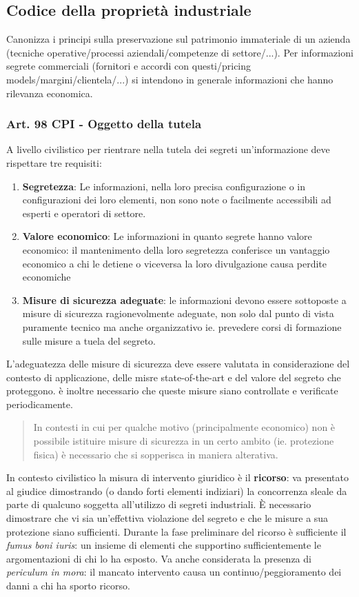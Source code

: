 \documentclass[11pt,a4paper]{article}
\begin{document}
\subsection{Codice della proprietà industriale}
Canonizza i principi sulla preservazione sul patrimonio immateriale di un azienda (tecniche operative/processi aziendali/competenze di settore/...).
Per informazioni segrete commerciali (fornitori e accordi con questi/pricing models/margini/clientela/...) si intendono in generale informazioni che hanno rilevanza economica.

\subsubsection{Art. 98 CPI - Oggetto della tutela}
A livello civilistico per rientrare nella tutela dei segreti un'informazione deve rispettare tre requisiti:
\begin{enumerate}
    \item \textbf{Segretezza}: Le informazioni, nella loro precisa configurazione o in configurazioni dei loro elementi, non sono note o facilmente accessibili ad esperti e operatori di settore.
    \item \textbf{Valore economico}: Le informazioni in quanto segrete hanno valore economico: il mantenimento della loro segretezza conferisce un vantaggio economico a chi le detiene o viceversa la loro divulgazione causa perdite economiche
    \item \textbf{Misure di sicurezza adeguate}: le informazioni devono essere sottoposte a misure di sicurezza ragionevolmente adeguate, non solo dal punto di vista puramente tecnico ma anche organizzativo ie. prevedere corsi di formazione sulle misure a tuela del segreto.
\end{enumerate}

L'adeguatezza delle misure di sicurezza deve essere valutata in considerazione del contesto di applicazione, delle misre state-of-the-art e del valore del segreto che proteggono. è inoltre necessario che queste misure siano controllate e verificate periodicamente.

\begin{quote}
In contesti in cui per qualche motivo (principalmente economico) non è possibile istituire misure di sicurezza in un certo ambito (ie. protezione fisica) è necessario che si sopperisca in maniera alterativa.
\end{quote}

In contesto civilistico la misura di intervento giuridico è il \textbf{ricorso}: va presentato al giudice dimostrando (o dando forti elementi indiziari) la concorrenza sleale da parte di qualcuno soggetta all'utilizzo di segreti industriali. 
È necessario dimostrare che vi sia un'effettiva violazione del segreto e che le misure a sua protezione siano sufficienti.
Durante la fase preliminare del ricorso è sufficiente il \textit{fumus boni iuris}: un insieme di elementi che supportino sufficientemente le argomentazioni di chi lo ha esposto.
Va anche considerata la presenza di \textit{periculum in mora}: il mancato intervento causa un continuo/peggioramento dei danni a chi ha sporto ricorso.
\end{document}
